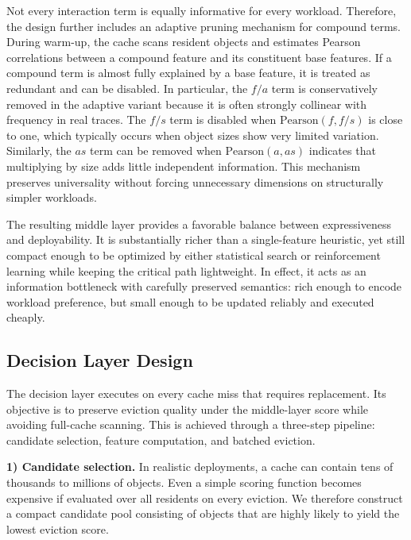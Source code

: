 \documentclass[10pt,journal]{IEEEtran}
\theoremstyle{slantedlemma}
\begin{document}
Not every interaction term is equally informative for every workload. Therefore, the design further includes an adaptive pruning mechanism for compound terms. During warm-up, the cache scans resident objects and estimates Pearson correlations between a compound feature and its constituent base features. If a compound term is almost fully explained by a base feature, it is treated as redundant and can be disabled. In particular, the $f/a$ term is conservatively removed in the adaptive variant because it is often strongly collinear with frequency in real traces. The $f/s$ term is disabled when $\mathrm{Pearson}(f, f/s)$ is close to one, which typically occurs when object sizes show very limited variation. Similarly, the $as$ term can be removed when $\mathrm{Pearson}(a, as)$ indicates that multiplying by size adds little independent information. This mechanism preserves universality without forcing unnecessary dimensions on structurally simpler workloads.

The resulting middle layer provides a favorable balance between expressiveness and deployability. It is substantially richer than a single-feature heuristic, yet still compact enough to be optimized by either statistical search or reinforcement learning while keeping the critical path lightweight. In effect, it acts as an information bottleneck with carefully preserved semantics: rich enough to encode workload preference, but small enough to be updated reliably and executed cheaply.

\subsection{Decision Layer Design}
The decision layer executes on every cache miss that requires replacement. Its objective is to preserve eviction quality under the middle-layer score while avoiding full-cache scanning. This is achieved through a three-step pipeline: candidate selection, feature computation, and batched eviction.

\textbf{1) Candidate selection.} In realistic deployments, a cache
can contain tens of thousands to millions of objects. Even
a simple scoring function becomes expensive if evaluated
over all residents on every eviction. We therefore construct a compact candidate pool consisting of objects that are highly likely to yield the lowest eviction score.
\end{document}
